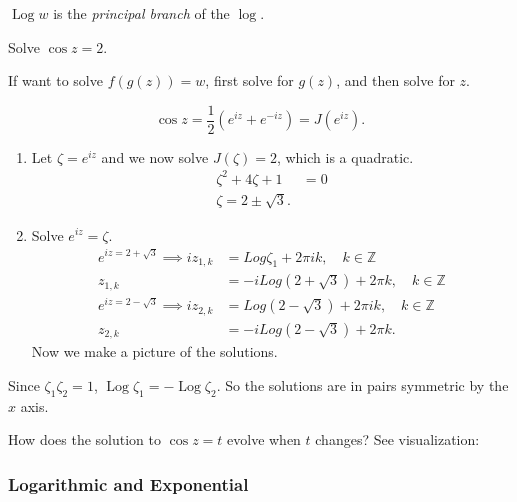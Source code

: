 $\operatorname{Log} w $ is the  \textit{principal branch} of the $\log$.


\begin{example}
	Solve $\cos z = 2$.
	
	If want to solve $f(g(z)) = w$, first solve for $g(z)$, and then solve for $z$.

	\[
		\cos z = \frac{1}{2} (e^{iz} + e^{-iz}) = J\left( e^{i z} \right)
	.\] 
	\begin{enumerate}
		\item Let $\zeta = e^{iz}$ and we now solve $J(\zeta) = 2$, which is a quadratic.
	\begin{align*}
		\zeta^2 + 4 \zeta + 1 &= 0\\
		\zeta = 2 \pm \sqrt{3} 
	.\end{align*} 

\item Solve $e^{iz } = \zeta$.
	\begin{align*}
		e^{i z = 2 + \sqrt{3} } \implies i z_{1,k} &= Log \zeta_1 + 2 \pi i k, \quad k \in \mathbb{Z}\\
 z_{1,k} &= - i Log \left( 2 + \sqrt{ 3}  \right)  + 2 \pi k, \quad k \in \mathbb{Z}\\
 e^{i z = 2 - \sqrt{3} } \implies i z_{2,k} &= Log \left( 2 - \sqrt{3}  \right)  + 2 \pi i k, \quad k \in \mathbb{Z}\\
 z_{2, k} &= - i Log(2 - \sqrt{3} ) + 2 \pi k
	.\end{align*}
	Now we make a picture of the solutions.
	\end{enumerate}
	Since $\zeta_1 \zeta_2 = 1$, $\operatorname{Log} \zeta_1 = - \operatorname{Log} \zeta_2 $. So the solutions are in pairs symmetric by the $x$ axis.

	How does the solution to $\cos z = t$ evolve when $t $ changes? See visualization:
		
\end{example}

\subsubsection{Logarithmic and Exponential}


